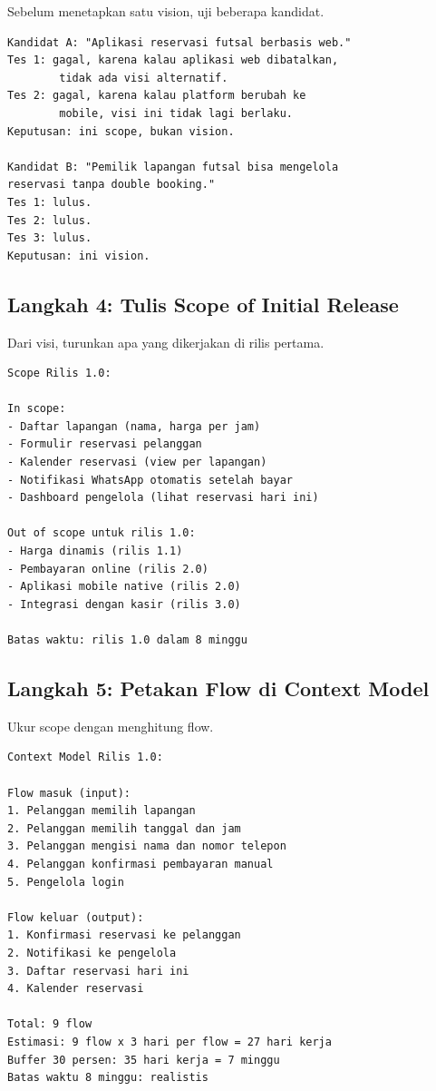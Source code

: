 \documentclass[11pt,a4paper]{article}
\begin{document}
Sebelum menetapkan satu vision, uji beberapa kandidat.

\begin{lstlisting}[style=out]
Kandidat A: "Aplikasi reservasi futsal berbasis web."
Tes 1: gagal, karena kalau aplikasi web dibatalkan,
        tidak ada visi alternatif.
Tes 2: gagal, karena kalau platform berubah ke
        mobile, visi ini tidak lagi berlaku.
Keputusan: ini scope, bukan vision.

Kandidat B: "Pemilik lapangan futsal bisa mengelola
reservasi tanpa double booking."
Tes 1: lulus.
Tes 2: lulus.
Tes 3: lulus.
Keputusan: ini vision.
\end{lstlisting}

\subsection{Langkah 4: Tulis Scope of Initial Release}

Dari visi, turunkan apa yang dikerjakan di rilis pertama.

\begin{lstlisting}[style=out]
Scope Rilis 1.0:

In scope:
- Daftar lapangan (nama, harga per jam)
- Formulir reservasi pelanggan
- Kalender reservasi (view per lapangan)
- Notifikasi WhatsApp otomatis setelah bayar
- Dashboard pengelola (lihat reservasi hari ini)

Out of scope untuk rilis 1.0:
- Harga dinamis (rilis 1.1)
- Pembayaran online (rilis 2.0)
- Aplikasi mobile native (rilis 2.0)
- Integrasi dengan kasir (rilis 3.0)

Batas waktu: rilis 1.0 dalam 8 minggu
\end{lstlisting}

\subsection{Langkah 5: Petakan Flow di Context Model}

Ukur scope dengan menghitung flow.

\begin{lstlisting}[style=out]
Context Model Rilis 1.0:

Flow masuk (input):
1. Pelanggan memilih lapangan
2. Pelanggan memilih tanggal dan jam
3. Pelanggan mengisi nama dan nomor telepon
4. Pelanggan konfirmasi pembayaran manual
5. Pengelola login

Flow keluar (output):
1. Konfirmasi reservasi ke pelanggan
2. Notifikasi ke pengelola
3. Daftar reservasi hari ini
4. Kalender reservasi

Total: 9 flow
Estimasi: 9 flow x 3 hari per flow = 27 hari kerja
Buffer 30 persen: 35 hari kerja = 7 minggu
Batas waktu 8 minggu: realistis
\end{lstlisting}
\end{document}
